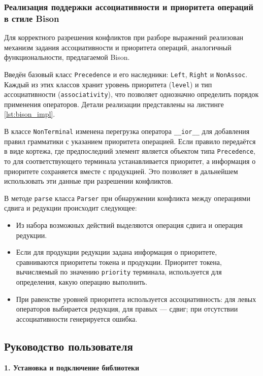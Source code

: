 \documentclass[14pt, russian]{scrartcl}
\begin{document}
\subsubsection{Реализация поддержки ассоциативности и приоритета операций в стиле Bison}

Для корректного разрешения конфликтов при разборе выражений реализован механизм задания ассоциативности и
приоритета операций, аналогичный функциональности, предлагаемой Bison.

Введён базовый класс \texttt{Precedence} и его наследники: \texttt{Left}, \texttt{Right} и \texttt{NonAssoc}.
Каждый из этих классов хранит уровень приоритета (\texttt{level}) и тип ассоциативности (\texttt{associativity}),
что позволяет однозначно определить порядок применения операторов. Детали реализации представлены на листинге
\ref{lst:bison_impl}.

В классе \texttt{NonTerminal} изменена перегрузка оператора \texttt{\_\_ior\_\_} для добавления правил
грамматики с указанием приоритета операцией.
Если правило передаётся в виде кортежа, где предпоследний элемент является объектом типа \texttt{Precedence},
то для соответствующего терминала устанавливается приоритет, а информация о приоритете сохраняется вместе с
продукцией. Это позволяет в дальнейшем использовать эти данные при разрешении конфликтов.

В методе \texttt{parse} класса \texttt{Parser} при обнаружении конфликта между операциями сдвига и редукции
происходит следующее:
\begin{itemize}
	\item Из набора возможных действий выделяются операция сдвига и операция редукции.
	\item Если для продукции редукции задана информация о приоритете, сравниваются приоритеты токена и
	продукции. Приоритет токена, вычисляемый по значению \texttt{priority} терминала, используется для
	определения, какую операцию выполнить.
	\item При равенстве уровней приоритета используется ассоциативность: для левых операторов выбирается
	редукция, для правых --- сдвиг; при отсутствии ассоциативности генерируется ошибка.
\end{itemize}


\subsection{Руководство пользователя}

\textbf{1. Установка и подключение библиотеки}
\end{document}
